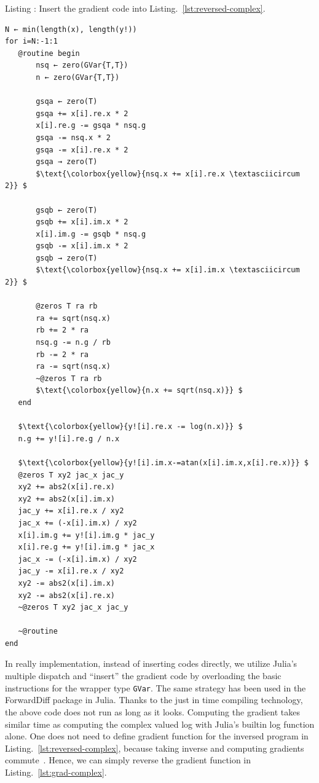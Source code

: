 \documentclass{article}
\newcommand{\listingcaption}[1]%
{%
\refstepcounter{lstlisting}\hfill%
Listing \thelstlisting: #1\hfill%
}%
\newcommand{\<}{\langle}
\renewcommand{\>}{\rangle}
\newcommand{\Lst}[1]{Listing.~\ref{#1}}
\theoremstyle{definition}\newtheorem{definition}{\textit{Definition}}
\begin{document}
\begin{minipage}{.88\columnwidth}
    \listingcaption{Insert the gradient code into \Lst{lst:reversed-complex}.}\label{lst:grad-complex}
    \begin{lstlisting}[mathescape=true,label={lst:grad-complex}, multicols=2]
N ← min(length(x), length(y!))
for i=N:-1:1
   @routine begin
       nsq ← zero(GVar{T,T})
       n ← zero(GVar{T,T})

       gsqa ← zero(T)
       gsqa += x[i].re.x * 2
       x[i].re.g -= gsqa * nsq.g
       gsqa -= nsq.x * 2
       gsqa -= x[i].re.x * 2
       gsqa → zero(T)
       $\text{\colorbox{yellow}{nsq.x += x[i].re.x \textasciicircum 2}} $

       gsqb ← zero(T)
       gsqb += x[i].im.x * 2
       x[i].im.g -= gsqb * nsq.g
       gsqb -= x[i].im.x * 2
       gsqb → zero(T)
       $\text{\colorbox{yellow}{nsq.x += x[i].im.x \textasciicircum 2}} $

       @zeros T ra rb
       ra += sqrt(nsq.x)
       rb += 2 * ra
       nsq.g -= n.g / rb
       rb -= 2 * ra
       ra -= sqrt(nsq.x)
       ~@zeros T ra rb
       $\text{\colorbox{yellow}{n.x += sqrt(nsq.x)}} $
   end

   $\text{\colorbox{yellow}{y![i].re.x -= log(n.x)}} $
   n.g += y![i].re.g / n.x

   $\text{\colorbox{yellow}{y![i].im.x-=atan(x[i].im.x,x[i].re.x)}} $
   @zeros T xy2 jac_x jac_y
   xy2 += abs2(x[i].re.x)
   xy2 += abs2(x[i].im.x)
   jac_y += x[i].re.x / xy2
   jac_x += (-x[i].im.x) / xy2
   x[i].im.g += y![i].im.g * jac_y
   x[i].re.g += y![i].im.g * jac_x
   jac_x -= (-x[i].im.x) / xy2
   jac_y -= x[i].re.x / xy2
   xy2 -= abs2(x[i].im.x)
   xy2 -= abs2(x[i].re.x)
   ~@zeros T xy2 jac_x jac_y

   ~@routine
end
\end{lstlisting}
\end{minipage}


In really implementation, instead of inserting codes directly, we utilize Julia's multiple dispatch and ``insert'' the gradient code by overloading the basic instructions for the wrapper type \texttt{GVar}.
The same strategy has been used in the ForwardDiff package in Julia.
Thanks to the just in time compiling technology, the above code does not run as long as it looks. Computing the gradient takes similar time as computing the complex valued log with Julia's builtin log function alone.
One does not need to define gradient function for the inversed program in \Lst{lst:reversed-complex}, because taking inverse and computing gradients commute~\cite{Mcinerney2015}. Hence, we can simply reverse the gradient function in \Lst{lst:grad-complex}.
\end{document}
